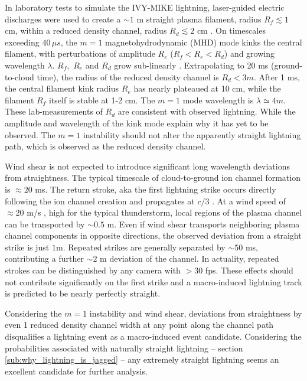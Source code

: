 \documentclass[%
 reprint,
 amsmath,amssymb,
 aps,
]{revtex4-2}
\newcommand{\vtwo}[1]{{\color{red} #1}}
\begin{document}
        In laboratory tests to simulate the IVY-MIKE lightning, laser-guided electric discharges were used to create a ${\sim 1}$ m straight plasma filament, radius $R_f\lesssim 1$ cm, within a reduced density channel, radius $R_d \lesssim 2$ cm \citep[][fig. 6]{IVY-MIKE1987}. On timescales exceeding $40 \, \mu s$, the $m=1$ magnetohydrodynamic (MHD) mode kinks the central filament, with perturbations of amplitude $R_e$ ($R_f < R_e < R_d$) and growing wavelength $\lambda$. $R_f$,\, $R_e$ and $R_d$ grow sub-linearly \citep[][fig. 9]{IVY-MIKE1987}. Extrapolating to 20 ms (ground-to-cloud time), the radius of the reduced density channel is $R_d<3m$. After 1 ms, the central filament kink radius $R_e$ has nearly plateaued at 10 cm, while the filament $R_f$ itself is stable at 1-2 cm. The $m=1$ mode wavelength is $\lambda\simeq4 m$. These lab-measurements of $R_d$ are consistent with observed lightning. While the amplitude and wavelength of the kink mode explain why it has yet to be observed. The $m=1$ instability should not alter the apparently straight lightning path, which is observed as the reduced density channel.

        Wind shear is not expected to introduce significant long wavelength deviations from straightness. The typical timescale of cloud-to-ground ion channel formation is ${\approx 20}$ ms. The return stroke, aka the first lightning strike \vtwo{\citep{DwyerUman2014}} occurs directly following the ion channel creation and propagates at $c/3$ \vtwo{\citep{Idone1987}}. At a wind speed of ${\approx 20}$ m/s \vtwo{\citep{Choi2004}}, high for the typical thunderstorm, local regions of the plasma channel can be transported by ${\sim 0.5}$ m. Even if wind shear transports neighboring plasma channel components in opposite directions, the observed deviation from a straight strike is just $1$m. Repeated strikes are generally separated by ${\sim 50}$ ms, contributing a further ${\sim 2}$ m deviation of the channel. In actuality, repeated strokes can be distinguished by any camera with $>30$ fps. These effects should not contribute significantly on the first strike and a macro-induced lightning track is predicted to be nearly perfectly straight.

        \vtwo{Considering the $m=1$ instability and wind shear, deviations from straightness by even 1 reduced density channel width at any point along the channel path disqualifies a lightning event as a macro-induced event candidate. Considering the probabilities associated with naturally straight lightning -- section \ref{sub:why_lightning_is_jagged} -- any extremely straight lightning seems an excellent candidate for further analysis.}
\end{document}
